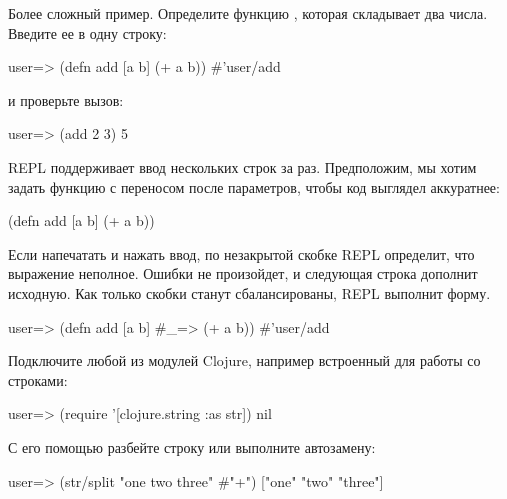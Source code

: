 Более сложный пример. Определите функцию , которая складывает два числа. Введите ее в одну строку:

\begin{english}
  \begin{clojure}
user=> (defn add [a b] (+ a b))
#'user/add
  \end{clojure}
\end{english}

\noindent
и проверьте вызов:

\begin{english}
  \begin{clojure}
user=> (add 2 3)
5
  \end{clojure}
\end{english}

REPL поддерживает ввод нескольких строк за раз. Предположим, мы хотим задать функцию с переносом после параметров, чтобы код выглядел аккуратнее:

\begin{english}
  \begin{clojure}
(defn add [a b]
  (+ a b))
  \end{clojure}
\end{english}

Если напечатать  и нажать ввод, по незакрытой скобке REPL определит, что выражение неполное. Ошибки не произойдет, и следующая строка дополнит исходную. Как только скобки станут сбалансированы, REPL выполнит форму.

\begin{english}
  \begin{clojure}
user=> (defn add [a b]
  #_=> (+ a b))
#'user/add
  \end{clojure}
\end{english}


Подключите любой из модулей Clojure, например встроенный  для работы со строками:

\begin{english}
  \begin{clojure}
user=> (require '[clojure.string :as str])
nil
  \end{clojure}
\end{english}

С его помощью разбейте строку или выполните автозамену:

\begin{english}
  \begin{clojure}
user=> (str/split "one two three" #"\s+")
["one" "two" "three"]
  \end{clojure}
\end{english}

